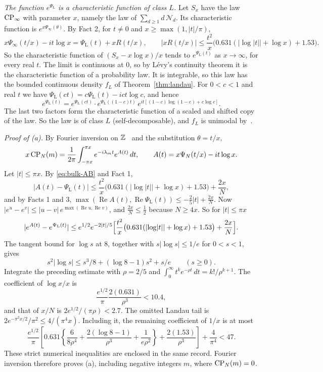 \emph{The function $e^{\Psi_{\mathrm L}}$ is a characteristic function of class $L$.} Let
$S_x$ have the law $\mathrm{CP}_\infty$ with parameter $x$, namely the law of
$\sum_{d\ge1}d\,\mathcal N_d$. Its characteristic function is
$e^{x\Psi_\infty(\theta)}$. By Fact 2, for $t\ne0$ and
$x\ge\max(1,\lvert t\rvert/\pi)$,
\begin{equation}\label{eq:bulk-AB}
 x\Psi_\infty(t/x)-it\log x=\Psi_{\mathrm L}(t)+xR(t/x),\qquad
 \lvert xR(t/x)\rvert\le\frac{t^2}x\bigl(0.631(\lvert\log\lvert t\rvert\rvert+\log x)+1.53\bigr).
\end{equation}
So the characteristic function of $(S_x-x\log x)/x$ tends to $e^{\Psi_{\mathrm L}(t)}$ as
$x\to\infty$, for every real $t$. The limit is continuous at $0$, so by
L\'evy's continuity theorem it is the characteristic function of a
probability law. It is integrable, so this law has the bounded continuous
density $f_L$ of Theorem~\ref{thm:landau}. For $0<c<1$ and real $t$ we have
$\Psi_{\mathrm L}(ct)=c\Psi_{\mathrm L}(t)-ict\log c$, and hence
\[
 e^{\Psi_{\mathrm L}(t)}=e^{\Psi_{\mathrm L}(ct)}\cdot e^{\Psi_{\mathrm L}((1-c)t)}\,e^{it[(1-c)\log(1-c)+c\log c]} .
\]
The last two factors form the characteristic function of a scaled and shifted
copy of the law. So the law is of class $L$ (self-decomposable), and $f_L$ is
unimodal by~\cite{yamazato1978}.

\emph{Proof of (a).} By Fourier inversion on $\mathbb{Z}$~\cite{katznelson2004} and the substitution
$\theta=t/x$,
\[
 x\,\mathrm{CP}_N(m)=\frac1{2\pi}\int_{-\pi x}^{\pi x}e^{-i\lambda_mt}e^{A(t)}\,dt,\qquad
 A(t)=x\Psi_N(t/x)-it\log x .
\]
Let $\lvert t\rvert\le\pi x$. By \eqref{eq:bulk-AB} and Fact 1,
\[
 \lvert A(t)-\Psi_{\mathrm L}(t)\rvert\le\frac{t^2}x\bigl(0.631(\lvert\log\lvert t\rvert\rvert+\log x)+1.53\bigr)+\frac{2x}N,
\]
and by Facts 1 and 3,
$\max(\operatorname{Re}A(t),\operatorname{Re}\Psi_{\mathrm L}(t))\le-\frac25\lvert t\rvert+\frac{2x}N$.
Now $\lvert e^u-e^v\rvert\le\lvert u-v\rvert\,e^{\max(\operatorname{Re}u,\operatorname{Re}v)}$,
and $\frac{2x}N\le\frac12$ because $N\ge4x$. So for $\lvert t\rvert\le\pi x$
\[
 \lvert e^{A(t)}-e^{\Psi_{\mathrm L}(t)}\rvert\le e^{1/2}e^{-2\lvert t\rvert/5}
 \Bigl[\frac{t^2}x\bigl(0.631(\lvert\log\lvert t\rvert\rvert+\log x)+1.53\bigr)+\frac{2x}N\Bigr].
\]
The tangent bound for $\log s$ at $8$, together with
$s|\log s|\le1/e$ for $0<s<1$, gives
\[
 s^2|\log s|\le s^3/8+(\log8-1)s^2+s/e\qquad(s\ge0).
\]
Integrate the preceding estimate with $\rho=2/5$ and
$\int_0^\infty t^ke^{-\rho t}\,dt=k!/\rho^{k+1}$. The coefficient of
$\log x/x$ is
\[
 \frac{e^{1/2}}\pi\frac{2(0.631)}{\rho^3}<10.4,
\]
and that of $x/N$ is $2e^{1/2}/(\pi\rho)<2.7$.
The omitted Landau tail is
$2e^{-\pi^2x/2}/\pi^2\le4/(\pi^4x)$. Including it, the remaining
coefficient of $1/x$ is at most
\[
 \frac{e^{1/2}}\pi\left[
 0.631\left\{\frac6{8\rho^4}+\frac{2(\log8-1)}{\rho^3}
                         +\frac1{e\rho^2}\right\}
              +\frac{2(1.53)}{\rho^3}\right]+\frac4{\pi^4}<47.
\]
These strict numerical inequalities are enclosed in the same record.
Fourier inversion therefore proves (a), including negative integers
$m$, where $\mathrm{CP}_N(m)=0$.

